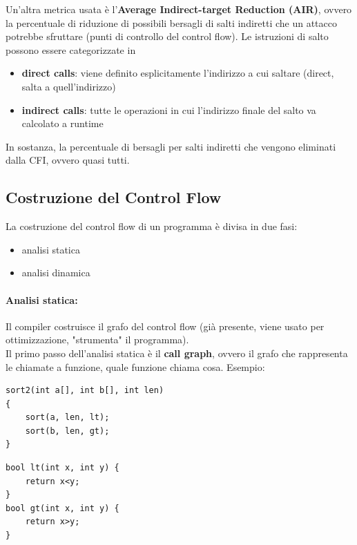 Un'altra metrica usata è l'\textbf{Average Indirect-target Reduction (AIR)}, ovvero la percentuale di riduzione di possibili bersagli di salti indiretti che un attacco potrebbe sfruttare (punti di controllo del control flow). Le istruzioni di salto possono essere categorizzate in 
\begin{itemize}
	\item \textbf{direct calls}: viene definito esplicitamente l'indirizzo a cui saltare (direct, salta a quell'indirizzo)
	\item \textbf{indirect calls}: tutte le operazioni in cui l'indirizzo finale del salto va calcolato a runtime
\end{itemize}

In sostanza, la percentuale di bersagli per salti indiretti che vengono eliminati dalla CFI, ovvero quasi tutti.\\

\subsection{Costruzione del Control Flow}

La costruzione del control flow di un programma è divisa in due fasi: 
\begin{itemize}
	\item analisi statica
	\item analisi dinamica
\end{itemize}

\paragraph{Analisi statica:} Il compiler costruisce il grafo del control flow (già presente, viene usato per ottimizzazione, "strumenta" il programma). \\

Il primo passo dell'analisi statica è il \textbf{call graph}, ovvero il grafo che rappresenta le chiamate a funzione, quale funzione chiama cosa. Esempio: 

\begin{center}
	\begin{minipage}[h]{0.52\textwidth}
		\begin{verbatim}
sort2(int a[], int b[], int len)
{
	sort(a, len, lt);
	sort(b, len, gt);
}
		\end{verbatim}
	\end{minipage}
	\begin{minipage}[h]{0.37\textwidth}
		\begin{verbatim}
bool lt(int x, int y) {
	return x<y;
}
bool gt(int x, int y) {
	return x>y;
}
		\end{verbatim}
	\end{minipage}
\end{center}

